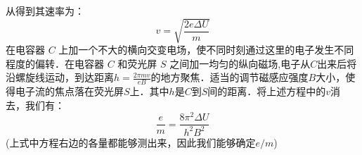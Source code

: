 从得到其速率为：
\begin{equation}
v=\sqrt{\frac{2e\Delta U}{m}}
\end{equation}
在电容器 $C$ 上加一个不大的横向交变电场，使不同时刻通过这里的电子发生不同程度的偏转．在电容器 $C$ 和荧光屏 $S$ 之间加一均匀的纵向磁场,电子从$C$出来后将沿螺旋线运动，到达距离$h=\frac{2\pi mv}{eB}$的地方聚焦．适当的调节磁感应强度$B$大小，使得电子流的焦点落在荧光屏$S$上．其中$h$是$C$到$S$间的距离．将上述方程中的$v$消去，我们有：
\begin{equation}
\frac {e}{m}=\frac{8\pi ^2 \Delta U}{h^2 B^2}
\end{equation}
(上式中方程右边的各量都能够测出来，因此我们能够确定$e/m$)
